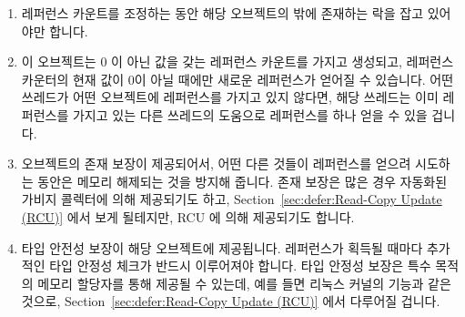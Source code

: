 \begin{enumerate}
\item	레퍼런스 카운트를 조정하는 동안 해당 오브젝트의 밖에 존재하는 락을 잡고
	있어야만 합니다.
\item	이 오브젝트는 0 이 아닌 값을 갖는 레퍼런스 카운트를 가지고 생성되고,
	레퍼런스 카운터의 현재 값이 0이 아닐 때에만 새로운 레퍼런스가 얻어질 수
	있습니다.
	어떤 쓰레드가 어떤 오브젝트에 레퍼런스를 가지고 있지 않다면, 해당
	쓰레드는 이미 레퍼런스를 가지고 있는 다른 쓰레드의 도움으로 레퍼런스를
	하나 얻을 수 있을 겁니다.
\item	오브젝트의 존재 보장이 제공되어서, 어떤 다른 것들이 레퍼런스를 얻으려
	시도하는 동안은 메모리 해제되는 것을 방지해 줍니다.
	존재 보장은 많은 경우 자동화된 가비지 콜렉터에 의해 제공되기도 하고,
	Section~\ref{sec:defer:Read-Copy Update (RCU)} 에서 보게 될테지만, RCU
	에 의해 제공되기도 합니다.
\item	타입 안전성 보장이 해당 오브젝트에 제공됩니다.
	레퍼런스가 획득될 때마다 추가적인 타입 안정성 체크가 반드시 이루어져야
	합니다.
	타입 안정성 보장은 특수 목적의 메모리 할당자를 통해 제공될 수 있는데,
	예를 들면 리눅스 커널의  기능과 같은 것으로,
	Section~\ref{sec:defer:Read-Copy Update (RCU)} 에서 다루어질 겁니다.
\iffalse

\item	A lock residing outside of the object must be held while
	manipulating the reference count.
\item	The object is created with a non-zero reference count, and new
	references may be acquired only when the current value of
	the reference counter is non-zero.
	If a thread does not have a reference to a given object,
	it may obtain one with the help of another thread that
	already has a reference.
\item	An existence guarantee is provided for the object, preventing
	it from being freed while some other
	entity might be attempting to acquire a reference.
	Existence guarantees are often provided by automatic
	garbage collectors, and, as will be seen in
	Section~\ref{sec:defer:Read-Copy Update (RCU)}, by RCU.
\item	A type-safety guarantee is provided for the object.
	An additional identity check must be performed once
	the reference is acquired.
	Type-safety guarantees can be provided by special-purpose
	memory allocators, for example, by the
	\co{SLAB_DESTROY_BY_RCU} feature within the Linux kernel,
	as will be seen in Section~\ref{sec:defer:Read-Copy Update (RCU)}.
\fi
\end{enumerate}

